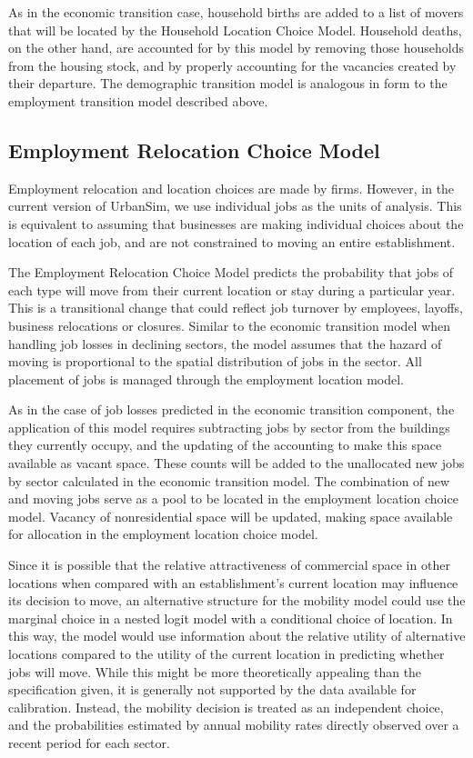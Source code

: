 As in the economic transition case, household births are added to
a list of movers that will be located by the Household Location
Choice Model.  Household deaths, on the other hand, are accounted
for by this model by removing those households from the housing
stock, and by properly accounting for the vacancies created by
their departure.  The demographic transition model is analogous in
form to the employment transition model described above.


\subsection{Employment Relocation Choice Model}

Employment relocation and location choices are made by firms.
However, in the current version of UrbanSim, we use individual
jobs as the units of analysis.  This is equivalent to assuming
that businesses are making individual choices about the location
of each job, and are not constrained to moving an entire
establishment.

The Employment Relocation Choice Model predicts the probability that jobs
of each type will move from their current location or stay during
a particular year. This is a transitional change that could
reflect job turnover by employees, layoffs, business relocations
or closures. Similar to the economic transition model when
handling job losses in declining sectors, the model assumes that
the hazard of moving is proportional to the spatial distribution
of jobs in the sector.  All placement of jobs is managed through
the employment location model.

As in the case of job losses predicted in the economic transition
component, the application of this model requires subtracting jobs
by sector from the buildings they currently occupy, and the
updating of the accounting to make this space available as vacant
space. These counts will be added to the unallocated new jobs by
sector calculated in the economic transition model. The
combination of new and moving jobs serve as a pool to be located
in the employment location choice model. Vacancy of nonresidential
space will be updated, making space available for allocation in
the employment location choice model.

Since it is possible that the relative attractiveness of
commercial space in other locations when compared with an
establishment's current location may influence its decision to
move, an alternative structure for the mobility model could use
the marginal choice in a nested logit model with a conditional
choice of location. In this way, the model would use information
about the relative utility of alternative locations compared to
the utility of the current location in predicting whether jobs
will move.  While this might be more theoretically appealing than
the specification given, it is generally not supported by the data
available for calibration. Instead, the mobility decision is
treated as an independent choice, and the probabilities estimated
by annual mobility rates directly observed over a recent period
for each sector.


